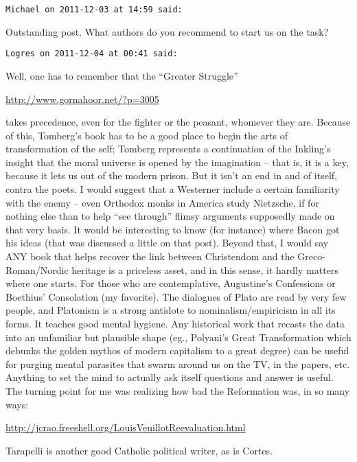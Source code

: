 \begin{footnotesize}\begin{sffamily}



\texttt{Michael on 2011-12-03 at 14:59 said: }

Outstanding post. What authors do you recommend to start us on the task?


\hfill

\texttt{Logres on 2011-12-04 at 00:41 said: }

Well, one has to remember that the ``Greater Struggle''

\url{http://www.gornahoor.net/?p=3005}

takes precedence, even for the fighter or the peasant, whomever they are. Because of this, Tomberg's book has to be a good place to begin the arts of transformation of the self; Tomberg represents a continuation of the Inkling's insight that the moral universe is opened by the imagination – that is, it is a key, because it lets us out of the modern prison. But it isn't an end in and of itself, contra the poets. I would suggest that a Westerner include a certain familiarity with the enemy – even Orthodox monks in America study Nietzsche, if for nothing else than to help ``see through'' flimsy arguments supposedly made on that very basis. It would be interesting to know (for instance) where Bacon got his ideas (that was discussed a little on that post). Beyond that, I would say ANY book that helps recover the link between Christendom and the Greco-Roman/Nordic heritage is a priceless asset, and in this sense, it hardly matters where one starts. For those who are contemplative, Augustine's Confessions or Boethius' Consolation (my favorite). The dialogues of Plato are read by very few people, and Platonism is a strong antidote to nominalism/empiricism in all its forms. It teaches good mental hygiene. Any historical work that recasts the data into an unfamiliar but plausible shape (eg., Polyani's Great Transformation which debunks the golden mythos of modern capitalism to a great degree) can be useful for purging mental parasites that swarm around us on the TV, in the papers, etc. Anything to set the mind to actually ask itself questions and answer is useful. The turning point for me was realizing how bad the Reformation was, in so many ways:

\url{http://jcrao.freeshell.org/LouisVeuillotReevaluation.html}

Tarapelli is another good Catholic political writer, as is Cortes.


\end{sffamily}
\end{footnotesize}
